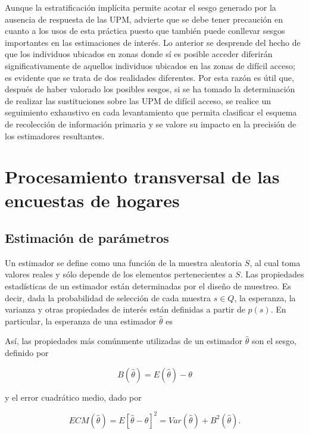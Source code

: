 \documentclass[
  10pt,
  spanish,
]{book}
\begin{document}
Aunque la estratificación implícita permite acotar el sesgo generado por la ausencia de respuesta de las UPM, \citet[págs. 348 - 349]{Vehovar_1999} advierte que se debe tener precaución en cuanto a los usos de esta práctica puesto que también puede conllevar sesgos importantes en las estimaciones de interés. Lo anterior se desprende del hecho de que los individuos ubicados en zonas donde sí es posible acceder diferirán significativamente de aquellos individuos ubicados en las zonas de difícil acceso; es evidente que se trata de dos realidades diferentes. Por esta razón es útil que, después de haber valorado los posibles sesgos, si se ha tomado la determinación de realizar las sustituciones sobre las UPM de difícil acceso, se realice un seguimiento exhaustivo en cada levantamiento que permita clasificar el esquema de recolección de información primaria y se valore su impacto en la precisión de los estimadores resultantes.

\hypertarget{part-procesamiento-transversal-de-las-encuestas-de-hogares}{%
\part{Procesamiento transversal de las encuestas de hogares}\label{part-procesamiento-transversal-de-las-encuestas-de-hogares}}

\hypertarget{estimaciuxf3n-de-paruxe1metros}{%
\chapter{Estimación de parámetros}\label{estimaciuxf3n-de-paruxe1metros}}

Un estimador se define como una función de la muestra aleatoria \(S\), al cual toma valores reales y sólo depende de los elementos pertenecientes a \(S\). Las propiedades estadísticas de un estimador están determinadas por el diseño de muestreo. Es decir, dada la probabilidad de selección de cada muestra \(s \in Q\), la esperanza, la varianza y otras propiedades de interés están definidas a partir de \(p(s)\). En particular, la esperanza de una estimador \(\hat\theta\) es

Así, las propiedades más comúnmente utilizadas de un estimador \(\hat\theta\) son el sesgo, definido por

\[
B(\hat\theta)=E(\hat\theta)-\theta
\]

y el error cuadrático medio, dado por

\[
ECM(\hat\theta)=E[\hat\theta-\theta]^2=Var(\hat\theta)+B^2(\hat\theta).
\]
\end{document}
